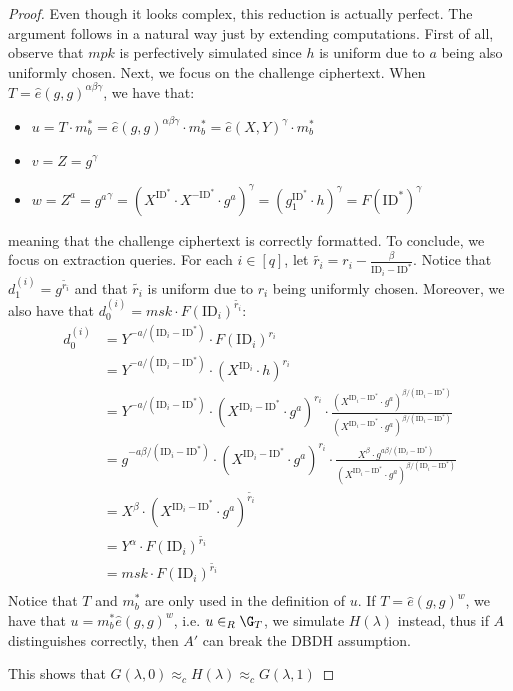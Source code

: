 \documentclass[a4paper, 12pt]{report}
\begin{document}
\begin{proof}
        Even though it looks complex, this reduction is actually perfect. The argument follows in a natural way just by extending computations. First of all, observe that $mpk$ is perfectively simulated since $h$ is uniform due to $a$ being also uniformly chosen. Next, we focus on the challenge ciphertext. When $T = \hat e(g,g)^{\alpha\beta\gamma}$, we have that:
        \begin{itemize}
            \item $u = T \cdot m_b^* = \hat e(g,g)^{\alpha\beta\gamma} \cdot m_b^* = \hat e(X,Y)^{\gamma} \cdot m_b^*$
            \item $v = Z = g^{\gamma}$
            \item $w = Z^a = {g^a}^{\gamma} = (X^{\mathrm{ID}^*} \cdot X^{-\mathrm{ID}^*} \cdot g^a)^{\gamma} = (g_1^{\mathrm{ID}^*} \cdot h)^{\gamma} = F(\mathrm{ID}^*)^{\gamma}$ 
        \end{itemize}
        meaning that the challenge ciphertext is correctly formatted. To conclude, we focus on extraction queries. For each $i \in [q]$, let $\tilde{r_i} = r_i - \frac{\beta}{\mathrm{ID}_i - \mathrm{ID}^*}$. Notice that $d_1^{(i)} = g^{\tilde{r_i}}$ and that $\tilde{r_i}$ is uniform due to $r_i$ being uniformly chosen. Moreover, we also have that $d_0^{(i)} = msk \cdot F(\mathrm{ID}_i)^{\tilde{r_i}}$:
        \[\begin{split}
            d_0^{(i)} &= Y^{-a/(\mathrm{ID}_i - \mathrm{ID}^*)} \cdot F(\mathrm{ID}_i)^{r_i} \\
            &= Y^{-a/(\mathrm{ID}_i - \mathrm{ID}^*)} \cdot (X^{\mathrm{ID}_i} \cdot h)^{r_i} \\
            &= Y^{-a/(\mathrm{ID}_i - \mathrm{ID}^*)} \cdot (X^{\mathrm{ID}_i-\mathrm{ID}^*} \cdot g^a)^{r_i} \cdot \frac{(X^{\mathrm{ID}_i - \mathrm{ID}^*} \cdot g^a)^{\beta/(\mathrm{ID}_i - \mathrm{ID}^*)}}{(X^{\mathrm{ID}_i-\mathrm{ID}^*} \cdot g^a)^{\beta/(\mathrm{ID}_i - \mathrm{ID}^*)}}\\
            &= g^{-a\beta/(\mathrm{ID}_i - \mathrm{ID}^*)} \cdot (X^{\mathrm{ID}_i-\mathrm{ID}^*} \cdot g^a)^{r_i} \cdot \frac{X^{\beta} \cdot g^{a\beta/(\mathrm{ID}_i - \mathrm{ID}^*)}}{(X^{\mathrm{ID}_i - \mathrm{ID}^*} \cdot g^a)^{\beta/(\mathrm{ID}_i - \mathrm{ID}^*)}}\\
            &= X^{\beta} \cdot (X^{\mathrm{ID}_i-\mathrm{ID}^*} \cdot g^a)^{\tilde{r_i}}\\
            &= Y^{\alpha} \cdot F(\mathrm{ID}_i)^{\tilde{r_i}}\\
            &= msk \cdot F(\mathrm{ID}_i)^{\tilde{r_i}}\\
        \end{split}\]
        Notice that $T$ and $m^*_b$ are only used in the definition of $u$. If $T = \hat e(g,g)^w$, we have that $u = m_b^*\hat e(g, g)^w$, i.e. $u \in_R \G_T$, we simulate $H(\lambda)$ instead, thus if $A$ distinguishes correctly, then $A'$ can break the DBDH assumption.

        This shows that $G(\lambda, 0) \approx_c H(\lambda) \approx_c G(\lambda, 1)$

    \end{proof}
    
\end{document}
